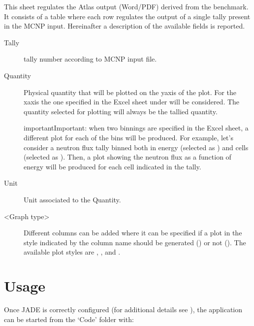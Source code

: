 \documentclass[letterpaper,10pt,english]{sphinxmanual}
\begin{document}
This sheet regulates the Atlas output (Word/PDF) derived from the benchmark. It consists of a table where each row regulates
the output of a single tally present in the MCNP input.
Hereinafter a description of the available fields is reported.
\begin{description}
\item[{Tally}] \leavevmode
tally number according to MCNP input file.

\item[{Quantity}] \leavevmode
Physical quantity that will be plotted on the y\sphinxhyphen{}axis of the plot. For the x\sphinxhyphen{}axis the one specified in the Excel sheet
under  will be considered. The quantity selected for plotting will always be the tallied quantity.

\begin{sphinxadmonition}{important}{Important:}
when two binnings are specified in the Excel sheet, a different plot for each of the  bins will be produced.
For example, let’s consider a neutron flux tally binned both in energy (selected as ) and cells (selected as ).
Then, a plot showing the neutron flux as a function of energy will be produced for each cell indicated in the tally.
\end{sphinxadmonition}

\item[{Unit}] \leavevmode
Unit associated to the Quantity.

\item[{\textless{}Graph type\textgreater{}}] \leavevmode
Different columns can be added where it can be specified if a plot in the style indicated by the column name
should be generated () or not (). The available plot styles are , ,
 and .

\end{description}


\chapter{Usage}
\label{\detokenize{usage/menu:usage}}\label{\detokenize{usage/menu:menu}}\label{\detokenize{usage/menu::doc}}
Once JADE is correctly configured
(for additional details see {\hyperref[\detokenize{usage/configuration:config}]{}}), the application can be started
from the ‘Code’ folder with:
\end{document}
